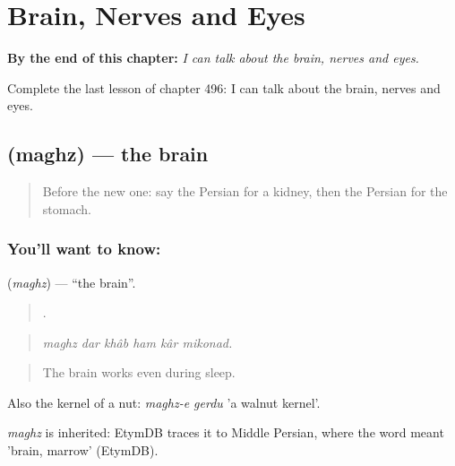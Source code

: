 
\chapter{Brain, Nerves and Eyes}
\label{ch:fa-brain-nerves-and-eyes}

\begin{chapteropening}
\textbf{By the end of this chapter:} \emph{I can talk about the brain, nerves and eyes.}

Complete the last lesson of chapter 496: I can talk about the brain, nerves and eyes.
\end{chapteropening}

\section[\texorpdfstring{\fa{مغز} (maghz)}{مغز (maghz)}]{ (maghz) — the brain}

\label{lesson:FA-C496-maghz}



\begin{quote}
Before the new one: say the Persian for a kidney, then the Persian for the stomach.
\end{quote}

\subsection*{You'll want to know: }
\textbf{} (\emph{maghz}) — \textquotedblleft{}the brain\textquotedblright{}.

\begin{quote}
     .
\end{quote}

\begin{quote}
\emph{maghz dar khâb ham kâr mikonad.}
\end{quote}

\begin{quote}
The brain works even during sleep.
\end{quote}

Also the kernel of a nut: \emph{maghz-e gerdu} 'a walnut kernel'.

\begin{cousinweb}
\emph{maghz} is inherited: EtymDB traces it to Middle Persian, where the word meant 'brain, marrow' (EtymDB).
\end{cousinweb}

